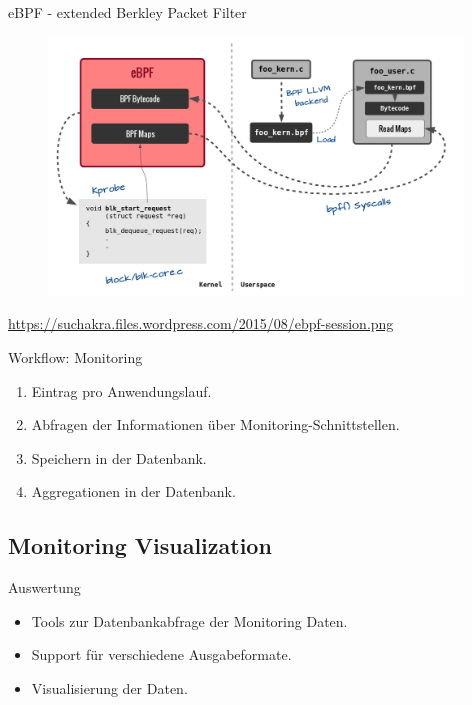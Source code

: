 \begin{frame}{eBPF - extended Berkley Packet Filter}
    \begin{figure}
        \centering
        \includegraphics[width=0.98\textwidth]{fig/ebpf-session.png}
    \end{figure}
    \tiny{\href{eBPF}{https://suchakra.files.wordpress.com/2015/08/ebpf-session.png}}
\end{frame}

\begin{frame}{Workflow: Monitoring}
    \begin{enumerate}
        \item Eintrag pro Anwendungslauf.
        \item Abfragen der Informationen \"{u}ber Monitoring-Schnittstellen.
        \item Speichern in der Datenbank.
        \item Aggregationen in der Datenbank.
    \end{enumerate}
\end{frame}

\subsection{Monitoring Visualization}

\begin{frame}{Auswertung}
    \begin{itemize}
        \item Tools zur Datenbankabfrage der Monitoring Daten.
        \item Support f\"{u}r verschiedene Ausgabeformate.
        \item Visualisierung der Daten.
    \end{itemize}
\end{frame}
